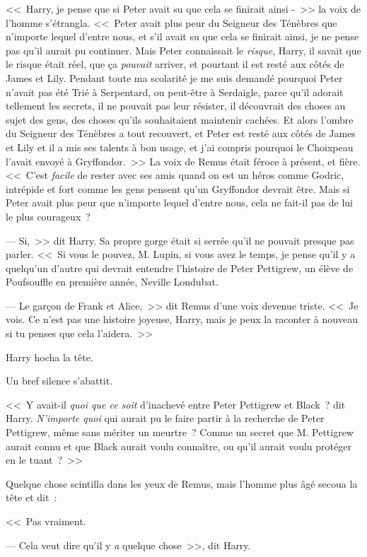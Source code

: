 <<~Harry, je pense que si Peter avait su que cela se finirait ainsi -~>> la voix de l'homme s'étrangla. <<~Peter avait plus peur du Seigneur des Ténèbres que n'importe lequel d'entre nous, et s'il avait su que cela se finirait ainsi, je ne pense pas qu'il aurait pu continuer. Mais Peter connaissait le \emph{risque}, Harry, il savait que le risque était réel, que ça \emph{pouvait} arriver, et pourtant il est resté aux côtés de James et Lily. Pendant toute ma scolarité je me suis demandé pourquoi Peter n'avait pas été Trié à Serpentard, ou peut-être à Serdaigle, parce qu'il adorait tellement les secrets, il ne pouvait pas leur résister, il découvrait des choses au sujet des gens, des choses qu'ils souhaitaient maintenir cachées. Et alors l'ombre du Seigneur des Ténèbres a tout recouvert, et Peter est resté aux côtés de James et Lily et il a mis ses talents à bon usage, et j'ai compris pourquoi le Choixpeau l'avait envoyé à Gryffondor.~>> La voix de Remus était féroce à présent, et fière. <<~C'est \emph{facile} de rester avec ses amis quand on est un héros comme Godric, intrépide et fort comme les gens pensent qu'un Gryffondor devrait être. Mais si Peter avait plus peur que n'importe lequel d'entre nous, cela ne fait-il pas de lui le plus courageux~?

--- Si,~>> dit Harry. Sa propre gorge était si serrée qu'il ne pouvait presque pas parler. <<~Si vous le pouvez, M. Lupin, si vous avez le temps, je pense qu'il y a quelqu'un d'autre qui devrait entendre l'histoire de Peter Pettigrew, un élève de Poufsouffle en première année, Neville Londubat.

--- Le garçon de Frank et Alice,~>> dit Remus d'une voix devenue triste. <<~Je vois. Ce n'est pas une histoire joyeuse, Harry, mais je peux la raconter à nouveau si tu penses que cela l'aidera.~>>

Harry hocha la tête.

Un bref silence s'abattit.

<<~Y avait-il \emph{quoi que ce soit} d'inachevé entre Peter Pettigrew et Black~? dit Harry. \emph{N'importe quoi} qui aurait pu le faire partir à la recherche de Peter Pettigrew, même sans mériter un meurtre~? Comme un secret que M. Pettigrew aurait connu et que Black aurait voulu connaître, ou qu'il aurait voulu protéger en le tuant~?~>>

Quelque chose scintilla dans les yeux de Remus, mais l'homme plus âgé secoua la tête et dit~:

<<~Pas vraiment.

--- Cela veut dire qu'il y \emph{a} quelque chose~>>, dit Harry.

